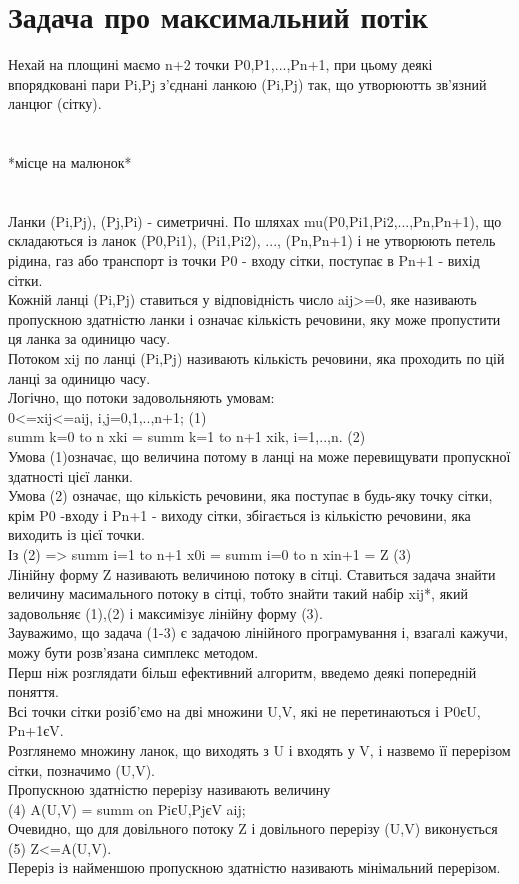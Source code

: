 \documentclass[12pt]{book}
\begin{document}
\section{Задача про максимальний потік}
Нехай на площині маємо n+2 точки P0,P1,...,Pn+1, при цьому деякі впорядковані пари Pi,Pj з’єднані ланкою (Pi,Pj) так, що утворюютть зв’язний ланцюг (сітку).\\
\\
\\
*місце на малюнок*\\
\\
\\
Ланки (Pi,Pj), (Pj,Pi) - симетричні.
По шляхах mu(P0,Pi1,Pi2,...,Pn,Pn+1), що складаються із ланок (P0,Pi1), (Pi1,Pi2), ..., (Pn,Pn+1) і не утворюють петель рідина, газ або транспорт із точки P0 - входу сітки, поступає в Pn+1 - вихід сітки.\\
Кожній ланці (Pi,Pj) ставиться у відповідність число aij>=0, яке називають пропускною здатністю ланки і означає кількість речовини, яку може пропустити ця ланка за одиницю часу.\\
Потоком xij по ланці (Pi,Pj) називають кількість речовини, яка проходить по цій ланці за одиницю часу.\\
Логічно, що потоки задовольняють умовам:\\
0<=xij<=aij, i,j=0,1,..,n+1; (1)\\
summ k=0 to n xki = summ k=1 to n+1 xik, i=1,..,n. (2)\\
Умова (1)означає, що величина потому в ланці на може перевищувати пропускної здатності цієї ланки.\\
Умова (2) означає, що кількість речовини, яка поступає в будь-яку точку сітки, крім P0 -входу і Pn+1 - виходу сітки, збігається із кількістю речовини, яка виходить із цієї точки.\\
Із (2) => summ i=1 to n+1 x0i = summ i=0 to n xin+1 = Z (3)\\
Лінійну форму Z називають величиною потоку в сітці. Ставиться задача знайти величину масимального потоку в сітці, тобто знайти такий набір xij*, який задовольняє (1),(2) і максимізує лінійну форму (3).\\
Зауважимо, що задача (1-3) є задачою лінійного програмування і, взагалі кажучи, можу бути розв’язана симплекс методом.\\
Перш ніж розглядати більш ефективний алгоритм, введемо деякі попередній поняття.\\
Всі точки сітки розіб’ємо на дві множини U,V, які не перетинаються і P0єU, Pn+1єV.\\
Розглянемо множину ланок, що виходять з U і входять у V, і назвемо її перерізом сітки, позначимо (U,V).\\
Пропускною здатністю перерізу називають величину\\
(4) A(U,V) = summ on PiєU,PjєV aij;\\
Очевидно, що для довільного потоку Z і довільного перерізу (U,V) виконується\\
(5) Z<=A(U,V).\\
Переріз із найменшою пропускною здатністю називають мінімальний перерізом.\\
\end{document}
